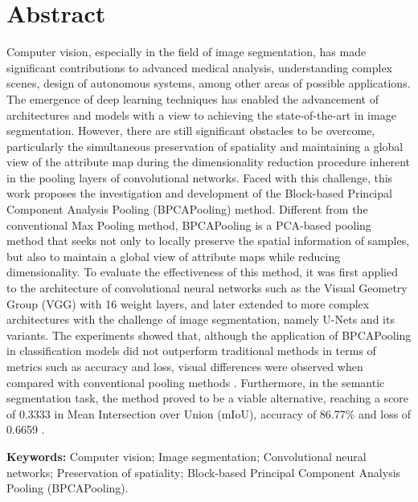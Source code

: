\section*{Abstract}
\thispagestyle{empty}
Computer vision, especially in the field of image segmentation, has made significant contributions to advanced medical analysis, understanding complex scenes, design of autonomous systems, among other areas of possible applications. The emergence of deep learning techniques has enabled the advancement of architectures and models with a view to achieving the state-of-the-art in image segmentation.
However, there are still significant obstacles to be overcome, particularly the simultaneous preservation of spatiality and maintaining a global view of the attribute map during the dimensionality reduction procedure inherent in the pooling layers of convolutional networks.
Faced with this challenge, this work proposes the investigation and development of the Block-based Principal Component Analysis Pooling (BPCAPooling) method. Different from the conventional Max Pooling method, BPCAPooling is a PCA-based pooling method that seeks not only to locally preserve the spatial information of samples, but also to maintain a global view of attribute maps while reducing dimensionality.
To evaluate the effectiveness of this method, it was first applied to the architecture of convolutional neural networks such as the Visual Geometry Group (VGG) with 16 weight layers, and later extended to more complex architectures with the challenge of image segmentation, namely U-Nets and its variants.
The experiments showed that, although the application of BPCAPooling in classification models did not outperform traditional methods in terms of metrics such as accuracy and loss, visual differences were observed when compared with conventional pooling methods . Furthermore, in the semantic segmentation task, the method proved to be a viable alternative, reaching a score of 0.3333 in Mean Intersection over Union (mIoU), accuracy of 86.77\% and loss of 0.6659 .

\textbf{Keywords:} Computer vision; Image segmentation; Convolutional neural networks; Preservation of spatiality; Block-based Principal Component Analysis Pooling (BPCAPooling).